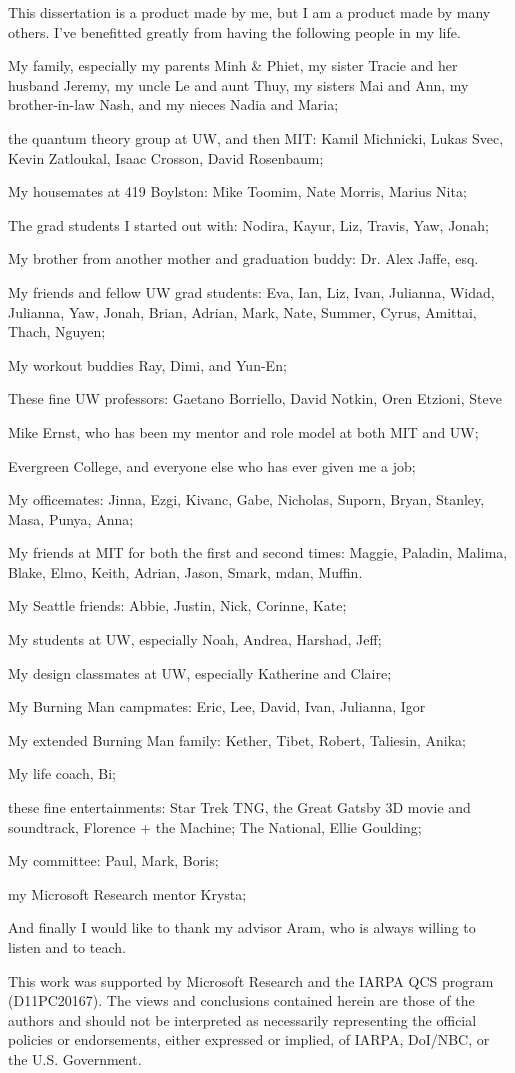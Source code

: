 This dissertation is a product made by me, but I am a product made by many others.
I've benefitted greatly from having the following people in my life.

My family, especially my parents Minh & Phiet, my sister Tracie and her husband Jeremy,
my uncle Le and aunt Thuy, my sisters Mai and Ann, my brother-in-law Nash,
and my nieces Nadia and Maria;

the quantum theory group at UW, and then MIT: Kamil Michnicki, Lukas Svec, Kevin Zatloukal, Isaac Crosson, David Rosenbaum;

My housemates at 419 Boylston: Mike Toomim, Nate Morris, Marius Nita;

The grad students I started out with: Nodira, Kayur, Liz, Travis, Yaw, Jonah;

My brother from another mother and graduation buddy: Dr. Alex Jaffe, esq.

My friends and fellow UW grad students: Eva, Ian, Liz, Ivan, Julianna, Widad, Julianna, Yaw, Jonah, Brian, Adrian, Mark, Nate, Summer, Cyrus, Amittai, Thach, Nguyen;

My workout buddies Ray, Dimi, and Yun-En;

These fine UW professors: Gaetano Borriello, David Notkin, Oren Etzioni, Steve

Mike Ernst, who has been my mentor and role model at both MIT and UW;

Evergreen College, and everyone else who has ever given me a job;

My officemates: Jinna, Ezgi, Kivanc, Gabe, Nicholas, Suporn, Bryan, Stanley, Masa, Punya, Anna;

My friends at MIT for both the first and second times:
Maggie, Paladin, Malima, Blake, Elmo, Keith, Adrian, Jason, Smark, mdan, Muffin.

My Seattle friends: Abbie, Justin, Nick, Corinne, Kate;

My students at UW, especially Noah, Andrea, Harshad, Jeff;

My design classmates at UW, especially Katherine and Claire;

My Burning Man campmates: Eric, Lee, David, Ivan, Julianna, Igor

My extended Burning Man family: Kether, Tibet, Robert, Taliesin, Anika;

My life coach, Bi;

these fine entertainments: Star Trek TNG, the Great Gatsby 3D movie and soundtrack, Florence + the Machine;
The National, Ellie Goulding;

My committee: Paul, Mark, Boris;

my Microsoft Research mentor Krysta;

And finally I would like to thank my advisor Aram,
who is always willing to listen and to teach.

This work was supported by Microsoft Research and
the IARPA QCS program (D11PC20167).  The
views and conclusions contained herein are those of the authors and
should not be interpreted as necessarily representing the official
policies or endorsements, either expressed or implied, of IARPA,
DoI/NBC, or the U.S. Government.